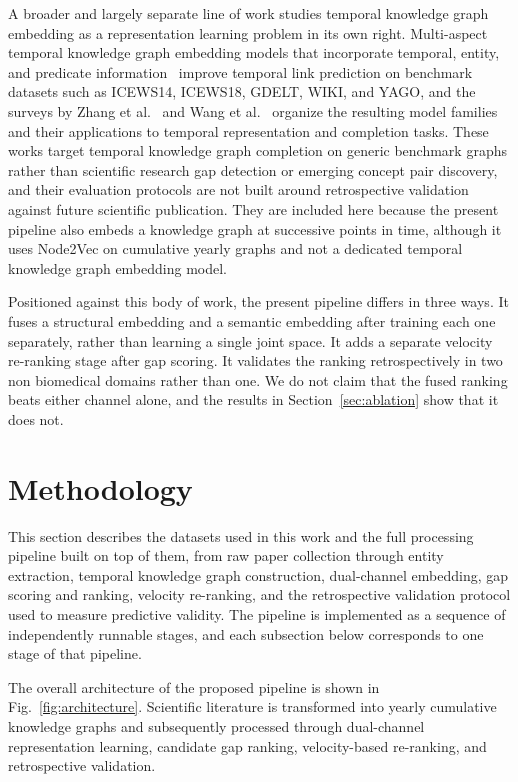 \documentclass{ieeeaccess}
\begin{document}
A broader and largely separate line of work studies temporal knowledge graph embedding as a representation learning problem in its own right. Multi-aspect temporal knowledge graph embedding models that incorporate temporal, entity, and predicate information~\cite{xie2023temporal} improve temporal link prediction on benchmark datasets such as ICEWS14, ICEWS18, GDELT, WIKI, and YAGO, and the surveys by Zhang et al.~\cite{zhang2024survey} and Wang et al.~\cite{wang2023survey} organize the resulting model families and their applications to temporal representation and completion tasks. These works target temporal knowledge graph completion on generic benchmark graphs rather than scientific research gap detection or emerging concept pair discovery, and their evaluation protocols are not built around retrospective validation against future scientific publication. They are included here because the present pipeline also embeds a knowledge graph at successive points in time, although it uses Node2Vec on cumulative yearly graphs and not a dedicated temporal knowledge graph embedding model.

Positioned against this body of work, the present pipeline differs in three ways. It fuses a structural embedding and a semantic embedding after training each one separately, rather than learning a single joint space. It adds a separate velocity re-ranking stage after gap scoring. It validates the ranking retrospectively in two non biomedical domains rather than one. We do not claim that the fused ranking beats either channel alone, and the results in Section~\ref{sec:ablation} show that it does not.


\section{Methodology}
\label{sec:methodology}


This section describes the datasets used in this work and the full processing pipeline built on top of them, from raw paper collection through entity extraction, temporal knowledge graph construction, dual-channel embedding, gap scoring and ranking, velocity re-ranking, and the retrospective validation protocol used to measure predictive validity. The pipeline is implemented as a sequence of independently runnable stages, and each subsection below corresponds to one stage of that pipeline.

The overall architecture of the proposed pipeline is shown in Fig.~\ref{fig:architecture}. Scientific literature is transformed into yearly cumulative knowledge graphs and subsequently processed through dual-channel representation learning, candidate gap ranking, velocity-based re-ranking, and retrospective validation.
\end{document}
